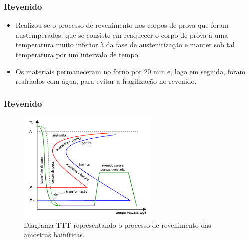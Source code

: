 \documentclass{beamer}
\begin{document}
\begin{frame}
\frametitle{Revenido}
\begin{itemize}
	\item Realizou-se o processo de revenimento nos corpos de prova que foram austemperados, que se consiste em reaquecer o corpo de prova a uma temperatura muito inferior à da fase de austenitização e manter sob tal temperatura por um intervalo de tempo.
	\item Os materiais permaneceram no forno por 20 min e, logo em seguida, foram resfriados com
	água, para evitar a fragilização no revenido.
\end{itemize}
\end{frame}

\begin{frame}
\frametitle{Revenido}

\begin{figure}
	\centering
	\includegraphics[width=0.6\textwidth]{revenid}
	\caption{Diagrama TTT representando o processo de revenimento das amostras bainíticas.}
	\label{fig:revenid}
\end{figure}

\end{frame}
\end{document}
